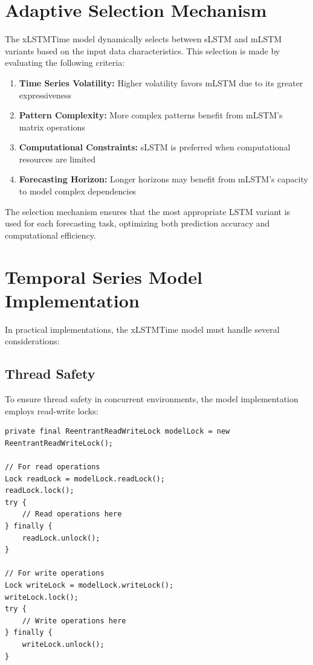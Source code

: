 \documentclass[11pt,a4paper]{article}
\begin{document}
\section{Adaptive Selection Mechanism}

The xLSTMTime model dynamically selects between sLSTM and mLSTM variants based on the input data characteristics. This selection is made by evaluating the following criteria:

\begin{enumerate}
    \item \textbf{Time Series Volatility:} Higher volatility favors mLSTM due to its greater expressiveness
    \item \textbf{Pattern Complexity:} More complex patterns benefit from mLSTM's matrix operations
    \item \textbf{Computational Constraints:} sLSTM is preferred when computational resources are limited
    \item \textbf{Forecasting Horizon:} Longer horizons may benefit from mLSTM's capacity to model complex dependencies
\end{enumerate}

The selection mechanism ensures that the most appropriate LSTM variant is used for each forecasting task, optimizing both prediction accuracy and computational efficiency.

\section{Temporal Series Model Implementation}

In practical implementations, the xLSTMTime model must handle several considerations:

\subsection{Thread Safety}

To ensure thread safety in concurrent environments, the model implementation employs read-write locks:

\begin{lstlisting}[caption=Thread safety implementation,label=lst:thread_safety]
private final ReentrantReadWriteLock modelLock = new ReentrantReadWriteLock();

// For read operations
Lock readLock = modelLock.readLock();
readLock.lock();
try {
    // Read operations here
} finally {
    readLock.unlock();
}

// For write operations
Lock writeLock = modelLock.writeLock();
writeLock.lock();
try {
    // Write operations here
} finally {
    writeLock.unlock();
}
\end{lstlisting}
\end{document}
